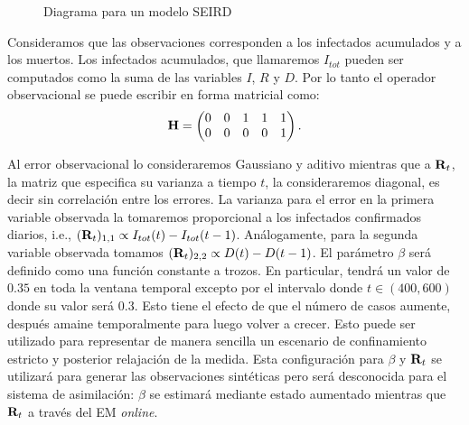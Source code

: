 \begin{figure}[h]
    \centering
    \caption{Diagrama para un modelo SEIRD} \label{dia:seird}
\end{figure}

Consideramos que las observaciones corresponden a los infectados acumulados y a los muertos. Los infectados acumulados, que llamaremos $I_{tot}$ pueden ser computados como la suma de las variables $I$, $R$ y $D$. Por lo tanto el operador observacional se puede escribir en forma matricial como:
\begin{align*}
    \mathbf{H} = 
    \begin{pmatrix}
        0 & 0 & 1 & 1 & 1 \\
        0 & 0 & 0 & 0 & 1 
    \end{pmatrix}.
\end{align*}

Al error observacional lo consideraremos Gaussiano y aditivo mientras que a $\mathbf{R}_t$, la matriz que especifica su varianza a tiempo $t$, la consideraremos diagonal, es decir sin correlación entre los errores. La varianza para el error en la primera variable observada la tomaremos proporcional a los infectados confirmados diarios,  i.e., $(\mathbf{R}_t)_{1,1} \propto I_{tot}(t) - I_{tot}(t-1)$. Análogamente, para la segunda variable observada tomamos $(\mathbf{R}_t)_{2,2} \propto D(t) - D(t-1)$. El parámetro $\beta$ será definido como una función constante a trozos. En particular, tendrá un valor de $0.35$ en toda la ventana temporal excepto por el intervalo donde $t \in (400, 600)$ donde su valor será $0.3$. Esto tiene el efecto de que el número de casos aumente, después amaine temporalmente para luego volver a crecer. Esto puede ser utilizado para representar de manera sencilla un escenario de confinamiento estricto y posterior relajación de la medida. Esta configuración para $\beta$ y $\mathbf{R}_t$ se utilizará para generar las observaciones sintéticas pero será desconocida para el sistema de asimilación: $\beta$ se estimará mediante estado aumentado mientras que $\mathbf{R}_t$ a través del EM \textit{online}.

